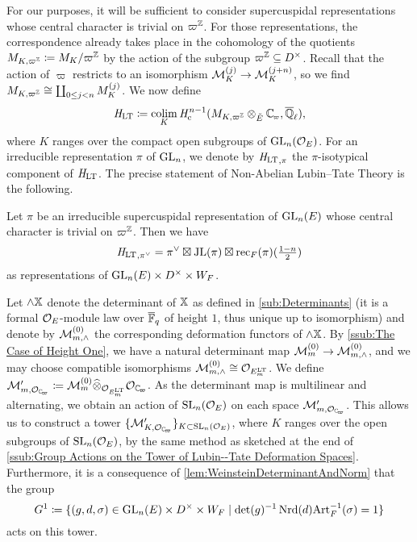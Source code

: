 \documentclass[../main.tex]{subfiles}
\begin{document}
For our purposes, it will be sufficient to consider supercuspidal representations
whose central character is trivial on $\varpi^{\mathbb{Z}}$. For those representations,
the correspondence already takes place in the cohomology of the 
quotients $M_{K, \varpi^{\mathbb{Z}}} \coloneqq M_K/\varpi^{\mathbb{Z}}$ by the action of the
subgroup $\varpi^{\mathbb{Z}} \subseteq D^\times$. Recall that the action of 
$\varpi$ restricts to an isomorphism $\mathcal{M}_K^{(j)} \to \mathcal{M}_K^{(j+n)}$, so we find
$M_{K, \varpi^{\mathbb{Z}}} \cong \coprod_{0 \leq j < n} M_{K}^{(j)}$. We now define
\begin{equation} \label{eq:defHLT}
  \HLT \coloneq \colim_{K} \hHc^{n-1} (M_{K, \varpi^\Z} \otimes_{\br E}\Cp, \bar \Q_\ell),
\end{equation}
where $K$ ranges over the compact open subgroups of $\operatorname{GL}_n(\mathcal{O}_E)$. 
For an irreducible representation $\pi$ of $\operatorname{GL}_n$, we denote by ${\mathit H_{\mathrm{LT}}}_{,\pi}$ the 
$\pi$-isotypical component of $\mathit H_{\mathrm{LT}}$.
The precise statement of Non-Abelian Lubin--Tate Theory is the following.
\begin{thm}\label{thm:NonAbLTT}
  Let $\pi$ be an irreducible supercuspidal representation of $\operatorname{GL}_n(E)$ whose central
  character is trivial on $\varpi^{\mathbb{Z}}$.   
  Then we have 
  \begin{equation*}
    {\mathit H_{\mathrm{LT}}}_{,\pi^\vee} = \pi^\vee \boxtimes \mathrm{JL}(\pi) \boxtimes \mathrm{rec}_F(\pi)(\tfrac{1-n}2)
  \end{equation*}
  as representations of $\operatorname{GL}_n(E) \times D^\times \times W_F$. 
\end{thm}

Let $\wedge \mathbb{X}$ denote the determinant of $\mathbb{X}$ as defined in 
\cref{sub:Determinants} (it is a formal $\mathcal{O}_E$-module law over
${\overline {\mathbb{F}}_q}$ of height $1$, thus unique up to isomorphism) 
and denote by $\mathcal{M}_{m, \wedge}^{(0)}$ the corresponding deformation functors of
$\wedge \mathbb{X}$. 
By \cref{ssub:The Case of Height One}, we have a natural
determinant map $\mathcal{M}_{m}^{(0)} \to \mathcal{M}_{m ,\wedge}^{(0)}$, and we may choose compatible
isomorphisms $\mathcal{M}_{m, \wedge}^{(0)} \cong \mathcal{O}_{E^{\mathrm{LT}}_m}$. 
We define $\cM'_{m,\cO_\Cp} \coloneq \cM_{m}^{(0)} \cotimes_{\cO_{E^\LT_m}} \cO_\Cp$.
As the determinant map is multilinear and alternating, we obtain an action of 
$\operatorname{SL}_n(\mathcal{O}_E)$ on each space $\cM'_{m,\cO_\Cp}$. This allows us to construct a tower
$\{\cM'_{K, \cO_\Cp}\}_{K \subset \SL_n(\cO_E)}$, where $K$ ranges over the 
open subgroups of $\operatorname{SL}_n(\mathcal{O}_E)$, by the same method as sketched 
at the end of \cref{ssub:Group Actions on the Tower of Lubin--Tate Deformation
Spaces}. Furthermore, it is a consequence of \cref{lem:WeinsteinDeterminantAndNorm}
that the group 
\begin{equation}\label{eq:DefGandG1}
  G^1 \coloneqq \{(g,d,\sigma) \in \operatorname{GL}_n(E) \times D^\times \times W_F \mid 
  \det(g)^{-1} \operatorname{Nrd}(d) \mathrm{Art}_F^{-1}(\sigma) = 1\}
\end{equation}
acts on this tower.
\end{document}
